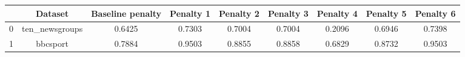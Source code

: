 \begin{tabular}{|l|c|c|c|c|c|c|c|c|}
\hline
 & Dataset & Baseline penalty & Penalty 1 & Penalty 2 & Penalty 3 & Penalty 4 & Penalty 5 & Penalty 6 \\
\hline
0 & ten_newsgroups & 0.6425 & 0.7303 & 0.7004 & 0.7004 & 0.2096 & 0.6946 & 0.7398 \\
1 & bbcsport & 0.7884 & 0.9503 & 0.8855 & 0.8858 & 0.6829 & 0.8732 & 0.9503 \\
\hline
\end{tabular}
